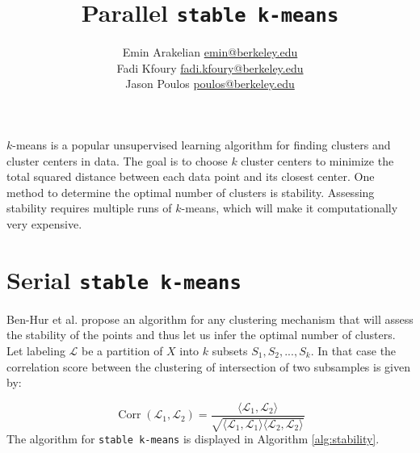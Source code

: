 \documentclass[a0paper,smallertitle]{HYposter}
\title{\hspace{20mm}Parallel \texttt{stable k-means}}
\author{Emin Arakelian \hspace{5mm}  \url{emin@berkeley.edu}  \\
Fadi Kfoury \hspace{5mm}  \url{fadi.kfoury@berkeley.edu}  \\
Jason Poulos \hspace{5mm}  \url{poulos@berkeley.edu}  }
\affiliation{}
\DeclareMathOperator{\Corr}{Corr}
\begin{document}

$k$-means is a popular unsupervised learning algorithm for finding clusters and cluster centers in data. The goal is to choose $k$ cluster centers to minimize the total squared distance between each data point and its closest center. One method to determine the optimal number of clusters is stability. Assessing stability requires multiple runs of $k$-means, which will make it computationally very expensive.


\section*{Serial \texttt{stable k-means}} \label{section:stable}
Ben-Hur et al.\cite{ben2001} propose an algorithm for any clustering mechanism that will assess the stability of the points and thus let us infer the optimal number of clusters. %
%
Let labeling $\mathcal{L}$ be a partition of $X$ into $k$ subsets $S_1, S_2, ... , S_k$. In that case the correlation score between the clustering of intersection of two subsamples is given by: 

\[
\Corr(\mathcal{L}_1, \mathcal{L}_2) = \frac{\langle \mathcal{L}_1, \mathcal{L}_2 \rangle}{\sqrt{\langle \mathcal{L}_1,\mathcal{L}_1\rangle \langle \mathcal{L}_2,\mathcal{L}_2\rangle}}
\] The algorithm for \texttt{stable k-means} is displayed in Algorithm \ref{alg:stability}.
\end{document}
